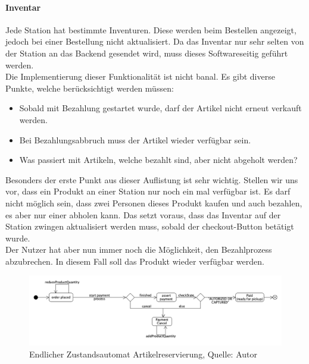 \paragraph{Inventar}
Jede Station hat bestimmte Inventuren. Diese werden beim Bestellen angezeigt, jedoch bei einer Bestellung nicht aktualisiert. Da das Inventar nur sehr selten von der Station an das Backend gesendet wird, muss dieses Softwareseitig geführt werden. \\
Die Implementierung dieser Funktionalität ist nicht banal. Es gibt diverse Punkte, welche berücksichtigt werden müssen: 
\begin{itemize}
	\item Sobald mit Bezahlung gestartet wurde, darf der Artikel nicht erneut verkauft werden.
	\item Bei Bezahlungsabbruch muss der Artikel wieder verfügbar sein.
	\item Was passiert mit Artikeln, welche bezahlt sind, aber nicht abgeholt werden?
\end{itemize}
Besonders der erste Punkt aus dieser Auflistung ist sehr wichtig. Stellen wir uns vor, dass ein Produkt an einer Station nur noch ein mal verfügbar ist. Es darf nicht möglich sein, dass zwei Personen dieses Produkt kaufen und auch bezahlen, es aber nur einer abholen kann. Das setzt voraus, dass das Inventar auf der Station zwingen aktualisiert werden muss, sobald der checkout-Button betätigt wurde.\\
Der Nutzer hat aber nun immer noch die Möglichkeit, den Bezahlprozess abzubrechen. In diesem Fall soll das Produkt wieder verfügbar werden. 
 \begin{figure}[H]
 	\centering
 	\includegraphics[width=1\textwidth]{images/stateMachineOrder.PNG}
 	\caption[Endlicher Zustandsautomat Artikelreservierung]{Endlicher Zustandsautomat Artikelreservierung, Quelle: Autor}
 	\label{img: stateMachine}
 \end{figure}

